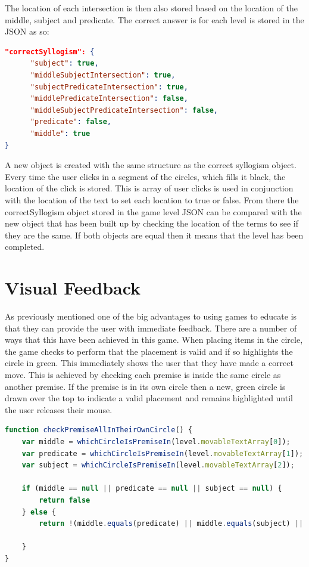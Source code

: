 \documentclass[12pt,a4paper]{report}
\begin{document}
The location of each intersection is then also stored based on the location of the middle, subject and predicate.
The correct answer is for each level is stored in the JSON as so:
\begin{lstlisting}[language=json]
"correctSyllogism": {
      "subject": true,
      "middleSubjectIntersection": true,
      "subjectPredicateIntersection": true,
      "middlePredicateIntersection": false,
      "middleSubjectPredicateIntersection": false,
      "predicate": false,
      "middle": true
}
\end{lstlisting}

A new object is created with the same structure as the correct syllogism object.
Every time the user clicks in a segment of the circles, which fills it black, the location of the click is stored. This is array of user clicks is used in conjunction with the location of the text to set each location to true or false. From there the correctSyllogism object stored in the game level JSON can be compared with the new object that has been built up by checking the location of the terms to see if they are the same. If both objects are equal then it means that the level has been completed.

\section{Visual Feedback}
As previously mentioned one of the big advantages to using games to educate is that they can provide the user with immediate feedback. There are a number of ways that this have been achieved in this game. When placing items in the circle, the game checks to perform that the placement is valid and if so highlights the circle in green. This immediately shows the user that they have made a correct move.  This is achieved by checking each premise is inside the same circle as another premise. If the premise is in its own circle then a new, green circle is drawn over the top to indicate a valid placement and remains highlighted until the user releases their mouse.

\begin{lstlisting}[language=JavaScript]
function checkPremiseAllInTheirOwnCircle() {
    var middle = whichCircleIsPremiseIn(level.movableTextArray[0]);
    var predicate = whichCircleIsPremiseIn(level.movableTextArray[1]);
    var subject = whichCircleIsPremiseIn(level.movableTextArray[2]);

    if (middle == null || predicate == null || subject == null) {
        return false
    } else {
        return !(middle.equals(predicate) || middle.equals(subject) || predicate.equals(subject));

    }
}
\end{lstlisting}
\end{document}
